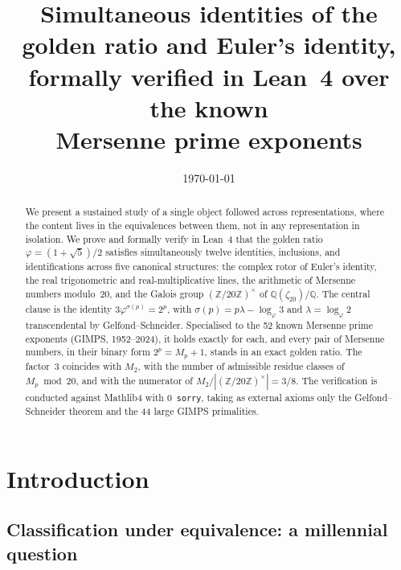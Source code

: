 \documentclass[11pt]{amsart}
\title[Simultaneous identities of the golden ratio]
      {Simultaneous identities of the golden ratio and Euler's identity,\\
       formally verified in Lean~4 over the known\\
       Mersenne prime exponents}
\date{\today}
\theoremstyle{definition}
\newcommand{\golden}{\varphi}
\newcommand{\Mp}{M_{p}}
\newcommand{\Ztwenty}{(\mathbb{Z}/20\mathbb{Z})^{\times}}
\begin{document}
\begin{abstract}
We present a sustained study of a single object followed across
representations, where the content lives in the equivalences between them,
not in any representation in isolation.  We prove and formally verify in
Lean~4 that the golden ratio
$\golden=(1+\sqrt5)/2$ satisfies simultaneously twelve identities,
inclusions, and identifications across five canonical structures: the
complex rotor of Euler's identity, the real trigonometric and
real-multiplicative lines, the arithmetic of Mersenne numbers
modulo~20, and the Galois group $\Ztwenty$ of
$\mathbb{Q}(\zeta_{20})/\mathbb{Q}$. The central clause is the identity
$3\golden^{\sigma(p)}=2^{p}$, with $\sigma(p)=p\lambda-\log_\golden 3$
and $\lambda=\log_\golden 2$ transcendental by Gelfond--Schneider.
Specialised to the 52 known Mersenne prime exponents (GIMPS,
1952--2024), it holds exactly for each, and every pair of Mersenne
numbers, in their binary form $2^{p}=M_{p}+1$, stands in an exact golden
ratio. The factor~3 coincides with
$M_{2}$, with the number of admissible residue classes of
$\Mp\bmod 20$, and with the numerator of $M_{2}/|\Ztwenty|=3/8$. The
verification is conducted against Mathlib4 with $0$~\texttt{sorry}, taking as external
axioms only the Gelfond--Schneider theorem and the 44 large GIMPS
primalities.
\end{abstract}

\maketitle

\section{Introduction}

\subsection{Classification under equivalence: a millennial question}
\label{ssec:classification}
\end{document}
